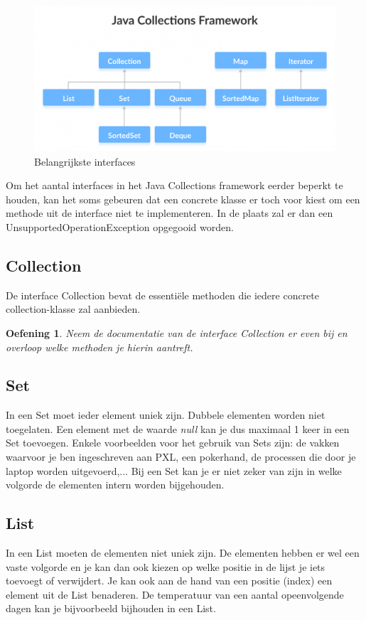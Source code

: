 \documentclass{tstextbook}
\newtheorem{envoefening}{Oefening}[chapter]
\newenvironment{oefening}
               {\begin{boxexercise}\begin{envoefening}}
               {\end{envoefening}\end{boxexercise}}
\begin{document}
\begin{figure}[H]
\includegraphics[width=\linewidth]{images/h3/colls-coreInterfaces.png}
\caption{Belangrijkste interfaces}
\label{fig:core_interfaces}
\end{figure}

Om het aantal interfaces in het Java Collections framework eerder beperkt te houden, kan het soms gebeuren dat een concrete klasse er toch voor kiest om een methode uit de interface niet te implementeren. In de plaats zal er dan een UnsupportedOperationException opgegooid worden.

\subsection{Collection}

De interface Collection bevat de essenti\"ele methoden die iedere concrete collection-klasse zal aanbieden.

\begin{oefening}
Neem de documentatie van de interface Collection er even bij en overloop welke methoden je hierin aantreft.
\end{oefening}

\subsection{Set}
In een Set moet ieder element uniek zijn. Dubbele elementen worden niet toegelaten. Een element met de waarde \textit{null} kan je dus maximaal 1 keer in een Set toevoegen.
Enkele voorbeelden voor het gebruik van Sets zijn: de vakken waarvoor je ben ingeschreven aan PXL, een pokerhand, de processen die door je laptop worden uitgevoerd,...
Bij een Set kan je er niet zeker van zijn in welke volgorde de elementen intern worden bijgehouden.

\subsection{List}
In een List moeten de elementen niet uniek zijn. De elementen hebben er wel een vaste volgorde en je kan dan ook kiezen op welke positie in de lijst je iets toevoegt of verwijdert. Je kan ook aan de hand van een positie (index) een element uit de List benaderen.
De temperatuur van een aantal opeenvolgende dagen kan je bijvoorbeeld bijhouden in een List.
\end{document}
